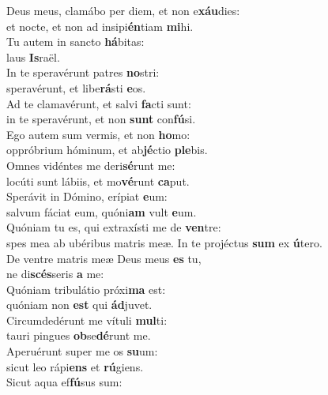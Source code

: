 \evenverse Deus meus, clamábo per diem, et non e\textbf{xáu}dies:~\*\\
\evenverse et nocte, et non ad insipi\textbf{én}tiam \textbf{mi}hi.\\
\oddverse Tu autem in sancto \textbf{há}bitas:~\*\\
\oddverse laus \textbf{Is}raël.\\
\evenverse In te speravérunt patres \textbf{no}stri:~\*\\
\evenverse speravérunt, et libe\textbf{rá}sti \textbf{e}os.\\
\oddverse Ad te clamavérunt, et salvi \textbf{fa}cti sunt:~\*\\
\oddverse in te speravérunt, et non \textbf{sunt} con\textbf{fú}si.\\
\evenverse Ego autem sum vermis, et non \textbf{ho}mo:~\*\\
\evenverse oppróbrium hóminum, et ab\textbf{jé}ctio \textbf{ple}bis.\\
\oddverse Omnes vidéntes me deri\textbf{sé}runt me:~\*\\
\oddverse locúti sunt lábiis, et mo\textbf{vé}runt \textbf{ca}put.\\
\evenverse Sperávit in Dómino, erípiat \textbf{e}um:~\*\\
\evenverse salvum fáciat eum, quóni\textbf{am} vult \textbf{e}um.\\
\oddverse Quóniam tu es, qui extraxísti me de \textbf{ven}tre:~\*\\
\oddverse spes mea ab ubéribus matris meæ. In te projéctus \textbf{sum} ex \textbf{ú}tero.\\
\evenverse De ventre matris meæ Deus meus \textbf{es} tu,~\*\\
\evenverse ne di\textbf{scés}seris \textbf{a} me:\\
\oddverse Quóniam tribulátio próxi\textbf{ma} est:~\*\\
\oddverse quóniam non \textbf{est} qui \textbf{ád}juvet.\\
\evenverse Circumdedérunt me vítuli \textbf{mul}ti:~\*\\
\evenverse tauri pingues \textbf{ob}se\textbf{dé}runt me.\\
\oddverse Aperuérunt super me os \textbf{su}um:~\*\\
\oddverse sicut leo rápi\textbf{ens} et \textbf{rú}giens.\\
\evenverse Sicut aqua ef\textbf{fú}sus sum:~\*\\
